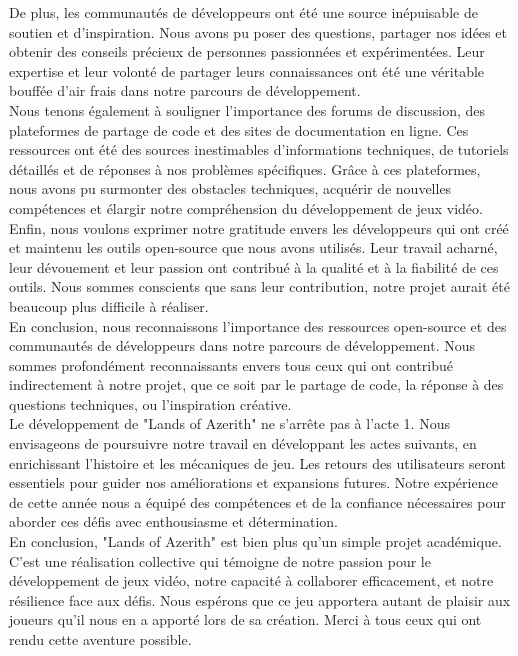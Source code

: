 De plus, les communautés de développeurs ont été une source inépuisable de soutien et d'inspiration.
Nous avons pu poser des questions, partager nos idées et obtenir des conseils précieux de personnes passionnées et expérimentées.
Leur expertise et leur volonté de partager leurs connaissances ont été une véritable bouffée d'air frais dans notre parcours de développement.
\\

Nous tenons également à souligner l'importance des forums de discussion, des plateformes de partage de code et des sites de documentation en ligne.
Ces ressources ont été des sources inestimables d'informations techniques, de tutoriels détaillés et de réponses à nos problèmes spécifiques.
Grâce à ces plateformes, nous avons pu surmonter des obstacles techniques, acquérir de nouvelles compétences et élargir notre compréhension du développement de jeux vidéo.
\\

Enfin, nous voulons exprimer notre gratitude envers les développeurs qui ont créé et maintenu les outils open-source que nous avons utilisés. Leur travail acharné, leur dévouement et leur passion ont contribué à la qualité et à la fiabilité de ces outils.
Nous sommes conscients que sans leur contribution, notre projet aurait été beaucoup plus difficile à réaliser.
\\

En conclusion, nous reconnaissons l'importance des ressources open-source et des communautés de développeurs dans notre parcours de développement.
Nous sommes profondément reconnaissants envers tous ceux qui ont contribué indirectement à notre projet, que ce soit par le partage de code, la réponse à des questions techniques, ou l'inspiration créative.
\\

Le développement de "Lands of Azerith" ne s'arrête pas à l'acte 1.
Nous envisageons de poursuivre notre travail en développant les actes suivants, en enrichissant l'histoire et les mécaniques de jeu.
Les retours des utilisateurs seront essentiels pour guider nos améliorations et expansions futures.
Notre expérience de cette année nous a équipé des compétences et de la confiance nécessaires pour aborder ces défis avec enthousiasme et détermination.
\\

En conclusion, "Lands of Azerith" est bien plus qu'un simple projet académique.
C'est une réalisation collective qui témoigne de notre passion pour le développement de jeux vidéo, notre capacité à collaborer efficacement, et notre résilience face aux défis.
Nous espérons que ce jeu apportera autant de plaisir aux joueurs qu'il nous en a apporté lors de sa création.
Merci à tous ceux qui ont rendu cette aventure possible.
